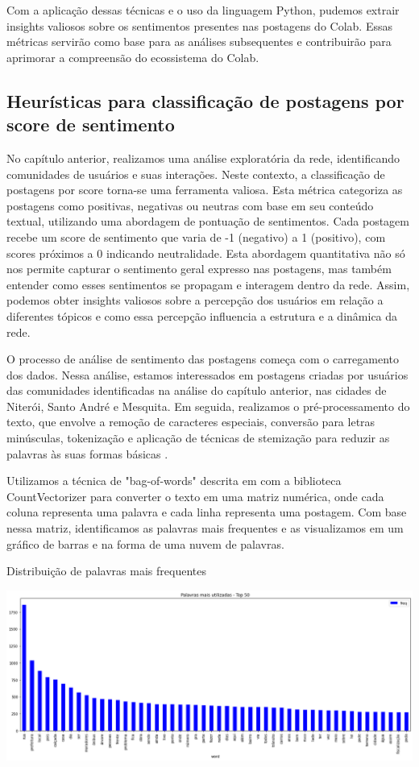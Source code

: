 Com a aplicação dessas técnicas e o uso da linguagem Python, pudemos extrair insights valiosos sobre os sentimentos presentes nas postagens do Colab. Essas métricas servirão como base para as análises subsequentes e contribuirão para aprimorar a compreensão do ecossistema do Colab.

\subsection{Heurísticas para classificação de postagens por score de sentimento}

No capítulo anterior, realizamos uma análise exploratória da rede, identificando comunidades de usuários e suas interações. Neste contexto, a classificação de postagens por score torna-se uma ferramenta valiosa. Esta métrica categoriza as postagens como positivas, negativas ou neutras com base em seu conteúdo textual, utilizando uma abordagem de pontuação de sentimentos. Cada postagem recebe um score de sentimento que varia de -1 (negativo) a 1 (positivo), com scores próximos a 0 indicando neutralidade. Esta abordagem quantitativa não só nos permite capturar o sentimento geral expresso nas postagens, mas também entender como esses sentimentos se propagam e interagem dentro da rede. Assim, podemos obter insights valiosos sobre a percepção dos usuários em relação a diferentes tópicos e como essa percepção influencia a estrutura e a dinâmica da rede.

O processo de análise de sentimento das postagens começa com o carregamento dos dados. Nessa análise, estamos interessados em postagens criadas por usuários das comunidades identificadas na análise do capítulo anterior, nas cidades de Niterói, Santo André e Mesquita. Em seguida, realizamos o pré-processamento do texto, que envolve a remoção de caracteres especiais, conversão para letras minúsculas, tokenização e aplicação de técnicas de stemização para reduzir as palavras às suas formas básicas \cite[]{2009_Bird_BOOK}.

Utilizamos a técnica de "bag-of-words" descrita em  com a biblioteca CountVectorizer para converter o texto em uma matriz numérica, onde cada coluna representa uma palavra e cada linha representa uma postagem. Com base nessa matriz, identificamos as palavras mais frequentes e as visualizamos em um gráfico de barras e na forma de uma nuvem de palavras.

\begin{quadro}[!htb]
	\caption{Distribuição de palavras mais frequentes}
	\label{fig:wordcount}
	\centering
	\includegraphics[width=\textwidth]{images/wordcount.png}
	\fautor
\end{quadro}

